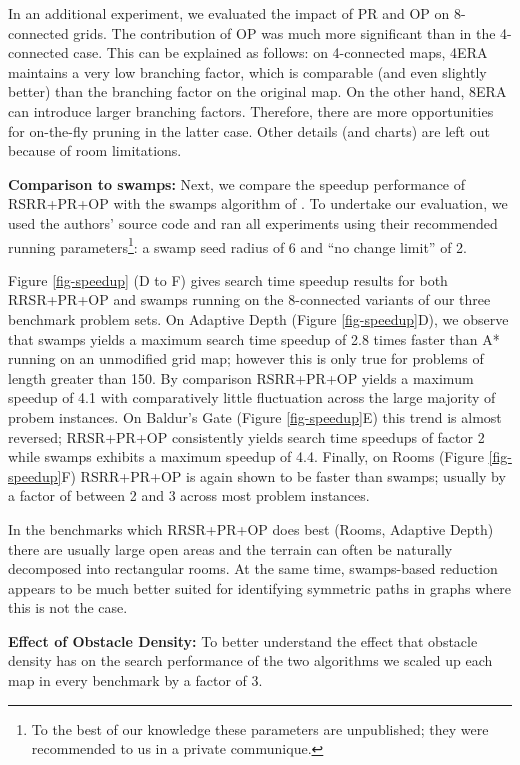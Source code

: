 In an additional experiment, we evaluated the impact of PR and OP on 8-connected grids.
The contribution of OP was much more significant than in the 4-connected case.
This can be explained as follows: on 4-connected maps, 4ERA maintains a very low
branching factor, which is comparable (and even slightly better) than the branching
factor on the original map. On the other hand, 8ERA can introduce larger branching factors.
Therefore, there are more opportunities for on-the-fly pruning in the latter case.
Other details (and charts) are left out because of room limitations.
\par
\textbf{Comparison to swamps:}
Next, we compare the speedup performance of RSRR+PR+OP with the swamps algorithm
of \cite{pochter10}.
To undertake our evaluation, we used the authors' source code and ran all experiments 
using their recommended running parameters\footnote{To the best of our knowledge 
these parameters are unpublished; they were recommended to us in a private communique.}:
 a swamp seed radius of 6 and ``no change limit'' of 2.
\par
Figure \ref{fig-speedup} (D to F) gives search time speedup results for both 
RRSR+PR+OP and swamps running on the 8-connected variants of our three benchmark 
problem sets. 
On Adaptive Depth (Figure \ref{fig-speedup}D), we observe that 
swamps yields a maximum search time speedup of 2.8 times faster than 
 A* running on an unmodified grid map; however this is only true for problems of length greater than 150.
By comparison RSRR+PR+OP yields a maximum speedup of 4.1 with comparatively little fluctuation across the
large majority of probem instances.
On Baldur's Gate (Figure \ref{fig-speedup}E) this trend is almost reversed; RRSR+PR+OP consistently 
yields search time speedups of factor 2 while swamps exhibits a maximum speedup of 4.4.
Finally, on Rooms (Figure \ref{fig-speedup}F) RSRR+PR+OP is again shown to be faster than swamps;
usually by a factor of between 2 and 3 across most problem instances.
\par
In the benchmarks which RRSR+PR+OP does best (Rooms, Adaptive Depth) 
there are usually large open areas and the terrain can often be naturally decomposed into rectangular rooms.
At the same time, swamps-based reduction appears to be much better suited for identifying symmetric paths 
in graphs where this is not the case.
\par
\textbf{Effect of Obstacle Density:}
To better understand the effect that obstacle density has on the search performance of the two algorithms
we scaled up each map in every benchmark by a factor of 3.

